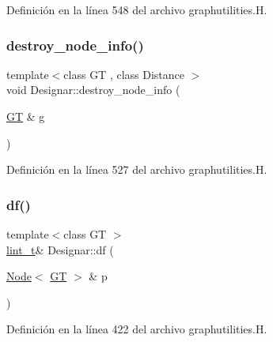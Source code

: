 Definición en la línea 548 del archivo graphutilities.\+H.

\mbox{\label{namespace_designar_a51119e58f118766eed21754bcbe93ec1}} 
\subsubsection{\texorpdfstring{destroy\+\_\+node\+\_\+info()}{destroy\_node\_info()}}
{\footnotesize\ttfamily template$<$class GT , class Distance $>$ \\
void Designar\+::destroy\+\_\+node\+\_\+info (\begin{DoxyParamCaption}\item[{\hyperlink{demo-buildgraph_8_c_a3001c40d2c31ca87ed96cd7d1334a55e}{GT} \&}]{g }\end{DoxyParamCaption})}



Definición en la línea 527 del archivo graphutilities.\+H.

\mbox{\label{namespace_designar_aacbba165f7a2d6b320e94303dc54aa2b}} 
\subsubsection{\texorpdfstring{df()}{df()}}
{\footnotesize\ttfamily template$<$class GT $>$ \\
\hyperlink{namespace_designar_a9d113d66a39e82b73727c72cd3a52f73}{lint\+\_\+t}\& Designar\+::df (\begin{DoxyParamCaption}\item[{\hyperlink{namespace_designar_a5af326c65aa2bd26b26c410f2030d09e}{Node}$<$ \hyperlink{demo-buildgraph_8_c_a3001c40d2c31ca87ed96cd7d1334a55e}{GT} $>$ \&}]{p }\end{DoxyParamCaption})\hspace{0.3cm}{\ttfamily [inline]}}



Definición en la línea 422 del archivo graphutilities.\+H.

\mbox{\label{namespace_designar_aea55a662f6563f40a64509015ca3ab10}} 
